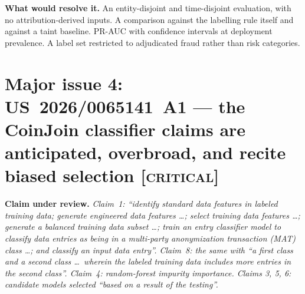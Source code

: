 \documentclass[10pt,a4paper]{article}
\newcommand{\claim}[1]{\noindent\textbf{Claim under review.} \emph{#1}\par\smallskip}
\newcommand{\sev}[1]{\textsc{\color{BrickRed}[#1]}}
\newcommand{\req}[1]{\noindent\textbf{What would resolve it.} #1\par}
\begin{document}
\req{An entity-disjoint and time-disjoint evaluation, with no attribution-derived inputs. A comparison against the labelling rule itself and against a taint baseline. PR-AUC with confidence intervals at deployment prevalence. A label set restricted to adjudicated fraud rather than risk categories.}

\section{Major issue 4: US~2026/0065141~A1 --- the CoinJoin classifier claims are anticipated, overbroad, and recite biased selection \sev{critical}}\label{sec:mat}
\claim{Claim~1: ``identify standard data features in labeled training data; generate engineered data features \ldots; select training data features \ldots; generate a balanced training data subset \ldots; train an entry classifier model to classify data entries as being in a multi-party anonymization transaction (MAT) class \ldots; and classify an input data entry''. Claim~8: the same with ``a first class and a second class \ldots\ wherein the labeled training data includes more entries in the second class''. Claim~4: random-forest impurity importance. Claims 3, 5, 6: candidate models selected ``based on a result of the testing''.}
\end{document}

